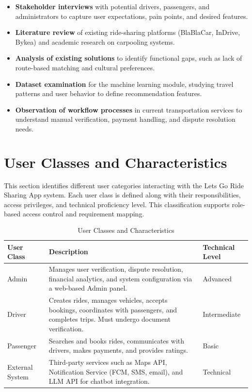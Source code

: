 \begin{itemize}
    \item \textbf{Stakeholder interviews} with potential drivers, passengers, and administrators to capture user expectations, pain points, and desired features.
    \item \textbf{Literature review} of existing ride-sharing platforms (BlaBlaCar, InDrive, Bykea) and academic research on carpooling systems.
    \item \textbf{Analysis of existing solutions} to identify functional gaps, such as lack of route-based matching and cultural preferences.
    \item \textbf{Dataset examination} for the machine learning module, studying travel patterns and user behavior to define recommendation features.
    \item \textbf{Observation of workflow processes} in current transportation services to understand manual verification, payment handling, and dispute resolution needs.
\end{itemize}

\section{User Classes and Characteristics}

This section identifies different user categories interacting with the Lets Go Ride Sharing App system. Each user class is defined along with their responsibilities, access privileges, and technical proficiency level. This classification supports role-based access control and requirement mapping.

\begin{table}[htbp]
\centering
\caption{User Classes and Characteristics}
\begin{tabularx}{\textwidth}{|p{3cm}|X|p{3cm}|}
\hline
\rowcolor{lightgray!30}
\textbf{User Class} & \textbf{Description} & \textbf{Technical Level} \\
\hline
Admin & Manages user verification, dispute resolution, financial analytics, and system configuration via a web-based Admin panel. & Advanced \\
\hline
Driver & Creates rides, manages vehicles, accepts bookings, coordinates with passengers, and completes trips. Must undergo document verification. & Intermediate \\
\hline
Passenger & Searches and books rides, communicates with drivers, makes payments, and provides ratings. & Basic \\
\hline
External System & Third-party services such as Maps API, Notification Service (FCM, SMS, email), and LLM API for chatbot integration. & Technical \\
\hline
\end{tabularx}
\end{table}

